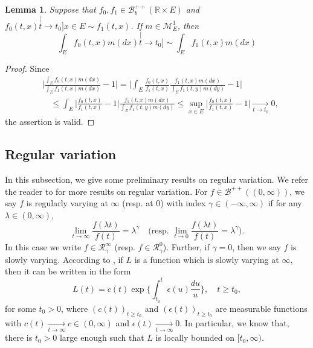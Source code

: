 \documentclass[12pt, a4paper]{amsart}
\newtheorem{lem}[thm]{Lemma}
\theoremstyle{definition}
\numberwithin{equation}{section}
\begin{document}
\begin{lem}
\label{lem: asymptotic equivalent of integration}
	Suppose that $f_0,f_1\in \mathscr B^{++}_b({\mathbb R \times E})$ and $f_0(t,x)\stackrel[t\to t_0]{x\in E}{\sim}f_1(t,x)$.
	If $m \in \mathcal M^1_E$, then 
\[
	\int_E f_0(t,x)m(dx)
	\stackrel[t\to t_0]{}{\sim}
	\int_E f_1(t,x)m(dx)
\]
\end{lem}
\begin{proof}
Since 
\[\begin{split}
	&\Big| \frac{	\int_E f_0(t,x)m(dx) }{ 	\int_E f_1(t,x)m(dx)  } - 1 \Big|
	= \Big| \int_E \frac{f_0(t,x)}{f_1(t,x)} \frac{f_1(t,x)m(dx)}{	\int_E f_1(t,y)m(dy)  } - 1\Big|
	\\&\quad \leq \int_E \Big|  \frac{f_0(t,x)}{f_1(t,x)} - 1 \Big| \frac{f_1(t,x)m(dx)}{	\int_E f_1(t,y)m(dy)  }
	\leq \sup_{x\in E} \Big|  \frac{f_0(t,x)}{f_1(t,x)} - 1 \Big|
	\xrightarrow[t\to t_0]{} 0,
\end{split}\]
the assertion is valid.
\end{proof}

\subsection{Regular variation}
\label{sec: Regularly variation}
	In this subsection, we give some preliminary results on regular variation.
	We refer the reader to \cite{BinghamGoldieTeugels1989Regular} for more results on  regular variation.
	For $f\in \mathscr B^{++}((0,\infty))$, we say $f$ is regularly varying at $\infty$ (resp. at $0$) with index $\gamma \in (-\infty,\infty)$ if for any $\lambda \in (0,\infty)$,
\[
	\lim_{t\to\infty}\frac{f(\lambda t)}{f(t)}
	= \lambda^\gamma
	\quad \Big(\text{resp. } \lim_{t\to 0}\frac{f(\lambda t)}{f(t)}
	= \lambda^\gamma\Big).
\]
In this case we write  $f\in \mathcal R^\infty_\gamma$ (resp. $f\in \mathcal R^0_\gamma$).
	Further, if $\gamma = 0$,
	then we say $f$ is slowly varying.
	According to \cite[Theorem 1.3.1.]{BinghamGoldieTeugels1989Regular}, if $L$ is a function which is slowly varying at $\infty$, then it can be written in the form
\[
	L(t)
	= c(t) \exp\Big\{\int_{t_0}^t \epsilon(u) \frac{du}{u}\Big\},\quad t\geq t_0,
\]
	for some $t_0>0$, where $(c(t))_{t\geq t_0}$ and $(\epsilon(t))_{t\geq t_0}$ are measurable functions with $c(t) \xrightarrow[t\to \infty]{} c \in (0,\infty)$ and $\epsilon(t) \xrightarrow[t\to \infty]{} 0$.
	In particular, we know that, there is $t_0 > 0$ large enough such that $L$ is locally bounded on $[t_0,\infty)$.
\end{document}
